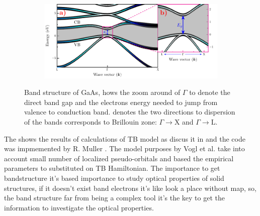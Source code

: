 \begin{figure}[h!]\label{fig:subsubsection-1.1.1-GaAsbands-1}
	\centering
	\begin{subfigure}{\textwidth}
	\includegraphics[width=\linewidth]{../figures/chapter-1/bands/build/bands01}
	\label{subfig:subsubsection-1.1.1-GaAsbands-1-a)}
	\label{subfig:subsubsection-1.1.1-GaAsbands-1-b)}
\end{subfigure}
	\caption{Band structure of GaAs,  hows the zoom around of $\Gamma$  to denote the direct band gap and the electrons energy  needed to jump from valence to conduction band.  denotes the two directions to dispersion of the bands corresponds to Brillouin zone: $\Gamma\to\mathrm{X}$ and  $\Gamma\to\mathrm{L}$.\cite{fox2002optical}}
\end{figure}

The  shows the results of calculations of TB model as discus it in \cite{vogl1983asemiempirical} and the code was impmemented by R. Muller \cite{rpmuller2017}. The model purposes by Vogl et al.  take into account small number of localized pseudo-orbitals and based the empirical parameters to substituted on TB Hamiltonian. 
The importance to get bandstructure it's based  importance to study optical properties of solid structures, if it doesn't exist  band electrons it's like look a place without map, so, the band structure  far from being  a complex tool it's the key to get the information to investigate the optical properties. 

